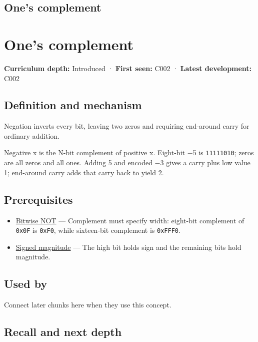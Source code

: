 \hypertarget{appendix-03c678cd40b3}{}
\section*{One's complement}
\chapter{One's complement}\label{appendix-03c678cd40b3-ones-complement}

\textbf{Curriculum depth:} Introduced · \textbf{First seen:} C002 · \textbf{Latest development:} C002

\section{Definition and mechanism}\label{appendix-03c678cd40b3-definition-and-mechanism}

Negation inverts every bit, leaving two zeros and requiring end-around carry for ordinary addition.

Negative x is the N-bit complement of positive x. Eight-bit −5 is \texttt{11111010}; zeros are all zeros and all ones. Adding 5 and encoded −3 gives a carry plus low value 1; end-around carry adds that carry back to yield 2.

\section{Prerequisites}\label{appendix-03c678cd40b3-prerequisites}

\begin{itemize}
\tightlist
\item
  \hyperref[appendix-8f38927cfc54]{Bitwise NOT} --- Complement must specify width: eight-bit complement of \texttt{0x0F} is \texttt{0xF0}, while sixteen-bit complement is \texttt{0xFFF0}.
\item
  \hyperref[appendix-ce20506c8532]{Signed magnitude} --- The high bit holds sign and the remaining bits hold magnitude.
\end{itemize}

\section{Used by}\label{appendix-03c678cd40b3-used-by}

Connect later chunks here when they use this concept.

\section{Recall and next depth}\label{appendix-03c678cd40b3-recall-and-next-depth}

